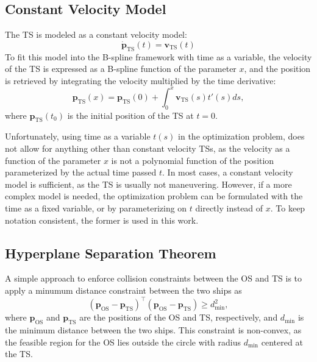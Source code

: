 \subsection{Constant Velocity Model}\label{sec:constant-velocity-model}
The \acrshort{TS} is modeled as a constant velocity model:
\begin{equation}
    \dot{\mathbf{p}}_{\text{TS}}(t) = \mathbf{v}_{\text{TS}}(t)
\end{equation}
To fit this model into the B-spline framework with time as a variable, the velocity of the \acrshort{TS} is expressed as a B-spline function of the parameter $x$, and the position is retrieved by integrating the velocity multiplied by the time derivative:
\begin{equation}\label{eq:ts-constant-velocity}
    \mathbf{p}_{\text{TS}}(x) = \mathbf p_\text{TS}(0) + \int_0^x \mathbf{v}_{\text{TS}}(s) t'(s) ds,
\end{equation}
where $\mathbf p_\text{TS}(t_0)$ is the initial position of the \acrshort{TS} at $t=0$. 

Unfortunately, using time as a variable $t(s)$ in the optimization problem, does not allow for anything other than constant velocity TSs, as the velocity as a function of the parameter $x$ is not a polynomial function of the position parameterized by the actual time passed $t$. In most cases, a constant velocity model is sufficient, as the \acrshort{TS} is usually not maneuvering. However, if a more complex model is needed, the optimization problem can be formulated with the time as a fixed variable, or by parameterizing on $t$ directly instead of $x$. To keep notation consistent, the former is used in this work.

\subsection{Hyperplane Separation Theorem}
A simple approach to enforce collision constraints between the \acrshort{OS} and \acrshort{TS} is to apply a minumum distance constraint between the two ships as
\begin{equation}\label{eq:minimum-distance}
    (\mathbf p_{\text{OS}} - \mathbf p_{\text{TS}})^\top (\mathbf p_{\text{OS}} - \mathbf p_{\text{TS}}) \geq d_{\text{min}}^2,
\end{equation}
where $\mathbf p_{\text{OS}}$ and $\mathbf p_{\text{TS}}$ are the positions of the OS and TS, respectively, and $d_{\text{min}}$ is the minimum distance between the two ships. This constraint is non-convex, as the feasible region for the OS lies outside the circle with radius $d_{\text{min}}$ centered at the TS.

